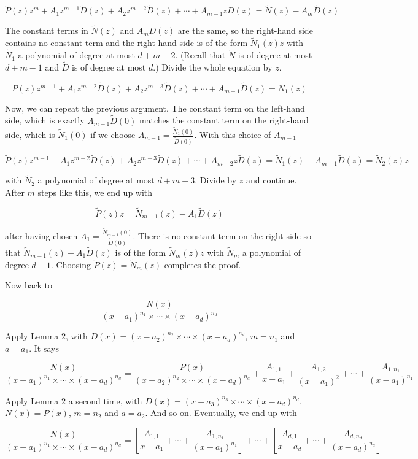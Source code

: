 \[
\tilde{P}(z)z^m + A_1 z^{m-1} \tilde{D}(z) + A_2 z^{m-2} \tilde{D}(z) + \cdots + A_{m-1} z \tilde{D}(z) = \tilde{N}(z) - A_m \tilde{D}(z)
\]

The constant terms in \(\tilde{N}(z)\) and \(A_m \tilde{D}(z)\) are the same, so the right-hand side contains no
constant term and the right-hand side is of the form \(\tilde{N}_1(z)z\) with \(\tilde{N}_1\) a polynomial of degree
at most \(d + m - 2\). (Recall that \(\tilde{N}\) is of degree at most \(d + m - 1\) and \(\tilde{D}\) is of degree at most
\(d\).) Divide the whole equation by \(z\).

\[
\tilde{P}(z)z^{m-1} + A_1 z^{m-2} \tilde{D}(z) + A_2 z^{m-3} \tilde{D}(z) + \cdots + A_{m-1} \tilde{D}(z) = \tilde{N}_1(z)
\]

Now, we can repeat the previous argument. The constant term on the left-hand side, which
is exactly \(A_{m-1} \tilde{D}(0)\) matches the constant term on the right-hand side, which is \(\tilde{N}_1(0)\) if we
choose \(A_{m-1} = \frac{\tilde{N}_1(0)}{\tilde{D}(0)}\). With this choice of \(A_{m-1}\)

\[
\tilde{P}(z)z^{m-1} + A_1 z^{m-2} \tilde{D}(z) + A_2 z^{m-3} \tilde{D}(z) + \cdots + A_{m-2} z \tilde{D}(z) = \tilde{N}_1(z) - A_{m-1} \tilde{D}(z) = \tilde{N}_2(z)z
\]

with \(\tilde{N}_2\) a polynomial of degree at most \(d + m - 3\). Divide by \(z\) and continue. After \(m\) steps
like this, we end up with

\[
\tilde{P}(z)z = \tilde{N}_{m-1}(z) - A_1 \tilde{D}(z)
\]

after having chosen \(A_1 = \frac{\tilde{N}_{m-1}(0)}{\tilde{D}(0)}\). There is no constant term on the right side so that
\(\tilde{N}_{m-1}(z) - A_1 \tilde{D}(z)\) is of the form \(\tilde{N}_m(z)z\) with \(\tilde{N}_m\) a polynomial of degree \(d - 1\). Choosing
\(\tilde{P}(z) = \tilde{N}_m(z)\) completes the proof.

Now back to

\[
\frac{N(x)}{{(x-a_1)}^{n_1} \times \cdots \times {(x-a_d)}^{n_d}}
\]

Apply Lemma 2, with \(D(x) = {(x - a_2)}^{n_2} \times \cdots \times {(x - a_d)}^{n_d}\), \(m = n_1\) and \(a = a_1\). It says

\[
\frac{N(x)}{{(x-a_1)}^{n_1} \times \cdots \times {(x-a_d)}^{n_d}} = \frac{P(x)}{{(x-a_2)}^{n_2} \times \cdots \times {(x-a_d)}^{n_d}} + \frac{A_{1,1}}{x-a_1} + \frac{A_{1,2}}{{(x-a_1)}^2} + \cdots + \frac{A_{1,n_1}}{{(x-a_1)}^{n_1}}
\]

Apply Lemma 2 a second time, with \(D(x) = {(x - a_3)}^{n_3} \times \cdots \times {(x - a_d)}^{n_d}\), \(N(x) = P(x)\),
\(m = n_2\) and \(a = a_2\). And so on. Eventually, we end up with

\[
\frac{N(x)}{{(x-a_1)}^{n_1} \times \cdots \times {(x-a_d)}^{n_d}} = \left[ \frac{A_{1,1}}{x-a_1} + \cdots + \frac{A_{1,n_1}}{{(x-a_1)}^{n_1}} \right] + \cdots + \left[ \frac{A_{d,1}}{x-a_d} + \cdots + \frac{A_{d,n_d}}{{(x-a_d)}^{n_d}} \right]
\]
